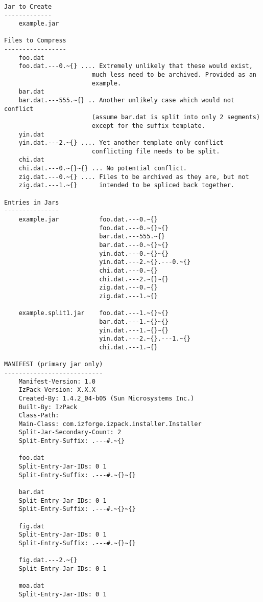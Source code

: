 \documentclass[a4paper, 12pt, pdftex]{report}
\begin{document}
\begin{verbatim}

Jar to Create
-------------
    example.jar

Files to Compress
-----------------
    foo.dat
    foo.dat.---0.~{} .... Extremely unlikely that these would exist,
                        much less need to be archived. Provided as an
                        example.
    bar.dat
    bar.dat.---555.~{} .. Another unlikely case which would not conflict
                        (assume bar.dat is split into only 2 segments)
                        except for the suffix template.
    yin.dat
    yin.dat.---2.~{} .... Yet another template only conflict
                        conflicting file needs to be split.
    chi.dat
    chi.dat.---0.~{}~{} ... No potential conflict.
    zig.dat.---0.~{} .... Files to be archived as they are, but not
    zig.dat.---1.~{}      intended to be spliced back together.

Entries in Jars
---------------
    example.jar           foo.dat.---0.~{}
                          foo.dat.---0.~{}~{}
                          bar.dat.---555.~{}
                          bar.dat.---0.~{}~{}
                          yin.dat.---0.~{}~{}
                          yin.dat.---2.~{}.---0.~{}
                          chi.dat.---0.~{}
                          chi.dat.---2.~{}~{}
                          zig.dat.---0.~{}
                          zig.dat.---1.~{}
    
    example.split1.jar    foo.dat.---1.~{}~{}
                          bar.dat.---1.~{}~{}
                          yin.dat.---1.~{}~{}
                          yin.dat.---2.~{}.---1.~{}
                          chi.dat.---1.~{}

MANIFEST (primary jar only)
---------------------------
    Manifest-Version: 1.0
    IzPack-Version: X.X.X
    Created-By: 1.4.2_04-b05 (Sun Microsystems Inc.)
    Built-By: IzPack
    Class-Path: 
    Main-Class: com.izforge.izpack.installer.Installer
    Split-Jar-Secondary-Count: 2
    Split-Entry-Suffix: .---#.~{}

    foo.dat
    Split-Entry-Jar-IDs: 0 1
    Split-Entry-Suffix: .---#.~{}~{}

    bar.dat
    Split-Entry-Jar-IDs: 0 1
    Split-Entry-Suffix: .---#.~{}~{}

    fig.dat
    Split-Entry-Jar-IDs: 0 1
    Split-Entry-Suffix: .---#.~{}~{}

    fig.dat.---2.~{}
    Split-Entry-Jar-IDs: 0 1

    moa.dat
    Split-Entry-Jar-IDs: 0 1 
\end{verbatim}
\end{document}
